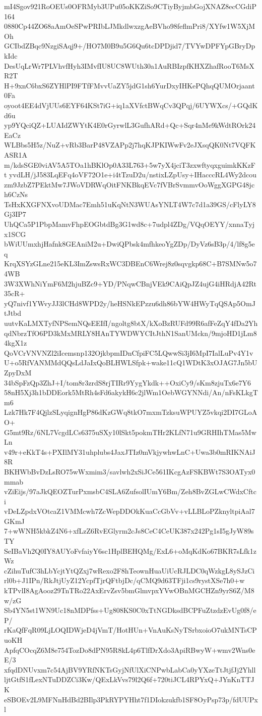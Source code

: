 mI4Sgov921RoOEUs0OFRMyb3UPu05oKKZiSo9CTiyByjmbGojXNAZ8ecCGdiP164
0880Cp44ZO68aAmOeSPwPRIbLJMkdlwxzgAeBVho98feflmPri8/XYfw1W5XjMOh
GCIbdZBqc9NzgiSAqj9+/HO7M0B9u5G6Qu6tcDPDjid7/TVYwDPFYpGBryDpkIdc
DesUqLrWr7PLVhvfHyh3IMvfIU8UC8WUth30a1AuRBIzpfKHXZhafRooT6MsXR2T
H+9xnC6bxS6ZYHlPI9FTfFMvvUaZY5jdG1sh6YurDxyIHKePQhqQUMOrjaant0Fa
oyoot4EE4dVjUUs6EYF64KSt7iG+iq1aXVfctBWqCv3QPqj/6UYWXcs/+GQdKd6u
yp9YQciQZ+LUAIdZWYtK4E0rGyrwlL3GufhARd+Qc+Sqr4nMe9kWdtROrk24EaCz
WLBbs5H5z/NuZ+vRb3BarP48VZAPp2j7hqKJPKIWwFv2eJXsqQK0Nt7VQFKASR1A
m/kdsSGE0viAV5A5TOa1hBKlOp0A33L763+5w7yX4jciT3zxwftyqxguimkKKzFt
yvdLH/jJ583LqEFq4oVF72O1e+i4tTzuD2u/nstixLZpUsy+IHacccRL4Wy2dcou
zm9JzbZ7PEktMw7JWoVDRWqOitFNKBkqEVc7fVBrSvmmvOoWggXGPG48jch6CzNs
TsHxKXGFNXvoUDMac7Emh51uKqNtN3WUAsYNLT4W7c7d1a39GS/cFlyLY8Gj3IP7
UhQCa5P1PbpMamvFhpEOGbtdBg3G1wd8c+7udpl4ZDg/VQqOEYY/xnnaTyjx1SCG
bWiUUmxhjHafnk8GEAniM2u+DwiQPbsk4mfhkeoYgZDp/DyVz6sB3p/4/lf8g5eq
KrqXSYzGLne215eKL3ImZswsRxWC3DBEnC6Wrej8z0sqvgkp68C+B7SMNw5o74WB
3W3XWhNiYmF6M2hjuBZc9+YD/PNqwCBnjVEk9CAiQpJZ4ujG4iHRdjA42Rt35cR+
yQ7nivf1YWvyJJ3lCHd8WPD2y/heHSNkEPzzu6dh86bYW4HWyTqQSAp5OmJtJtbd
uutvKaLMXTyfNPSemNQsEEIfI/ngoltg8btX/kXoBzRUFd99R6afFeZqY4fDa2Yh
qdNbrzTfO6PD3kMxMRLY8HAnTYWDWYCItJthN1SanUMckn/9mjoHD1jLm84kgX1z
QoVCrVNVNZl2iIcemsnp132OjkbpmIDnCfpiFC5LQwwSi3jI6MpI7IalLuPv4Y1v
U+o5RfVANMMdQQsLdJaIxQoBLHWLSfpk+wake11cQ1WDtK3xOJAG7Jn5bUZpyDxM
34bSpFzQp3ZhJ+I/tom8r3zrdS8rjTIRr9YygYkdk++OxiCy9/sKm8zjuTx6e7Y6
58nH5Xj3h1bDDEork5MtRh4sFd6akykH6c2jlWm1OebWGYNNdi/An/nFsKLkgTm6
Lzk7Hk7F4QjlzSLyqignHgP86dKzGWq8tkO7mxmTzksuWPUYZ5vkqi2DI7GLoAO+
G5mt9Rz/6NL7VcgdLCs6375uSXy10lSkt5pokmTHr2KLfN71u9GRHIhTMas5MwLn
v49r+eKkT4s+PXIlMY31uhplubs4JaxJTIz0mVkjywhwLnC+Uwa3b0mRIKNAiJ8R
BKHWbBvDzLsRO75wWxmim3/savlwh2xSiJCe561IKcgAzFSKBWt7S3OATyx0mmab
vZiEijs/97aJkQEOZTurPxmsbC4SLA6ZufsolIUmY6Bm/Zeh8BvZGLwCWdxCftci
vDeLZpdxVOtcaZ1VMMcwh7ZcWepDDOkKuaCcGbVv+vLLBLoPZknyltpiAal7GKmJ
7+wWNH5kbkZ4N6+xfLzZ6RvEGlyrm2cJs8CeC4CeUK387x242Pg1sI5gJyW89sTY
SeIBaVh2Q0IY8AUYoFvfaiyY6sc1HplBEHQMg/ExL6+oMqKdKo67BKR7sLfk1zWz
cZihuTufC3hLbYcjtYtQZxj7wRexo2F8hTeownHuaUiUcRJLDC0qWzkgL8ySJzCi
rl0b+J1IPn/RkJtjUyZ12YcpfTjrQFtbjDc/qCMQ9d63TFji1cs9rystXSe7h0+w
kTPvlI8AgAooz29TnTRo22AxErvZsv5bmGlmvpxYVwOBnMGCHZn9yrS6Z/M8w/zG
Sb4YN5st1WN9Uc18nMDPfss+Ug808KS0C0xTtNGDksdBCPFuZtzdzEvUg0f8/eP/
rKaQfFqR09LjLOQIDWjeD4jVmT/HotHUn+VnAuKsNyTSrbxoioO7ukMNTsCPuoKH
ApfqCOcqZ6M8e754TozDo8dPN95R8kL4p6TlfDrXdo3ApiRBwyW+wmv2Wns0eE/3
xfqdDNUvxm7c54AjBV9YRfNKTsGyjNfUlXiCNPwbLabCa0yYXzeTtJtjfJj2Yhll
ljtGtfS1fLexNTuDDZCi3Kw/QExLkVvs79l2Q6f+720tiJCL4RPYxQ+JYnKnTTJK
eSBOEv2L9MFNnHdBd2BIlp3PkRYPYHht7f1DIokzukfb1SF8OyPsp73p/fdUUPxl
